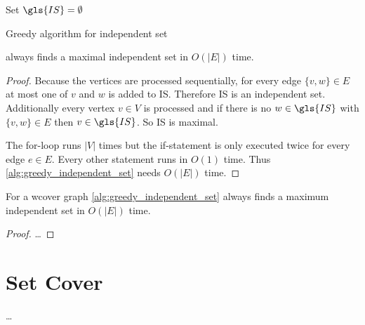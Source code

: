 

\begin{algorithm}
  \DontPrintSemicolon
  
  
  Set \(\gls{IS} = \emptyset\) \;
  \caption{\label{alg:greedy_independent_set}Greedy algorithm for independent set}
\end{algorithm}


\begin{theorem}
   always finds a maximal independent
  set in \(O(|E|)\) time.
\end{theorem}

\begin{proof}
  Because the vertices are processed sequentially, for every edge
  \(\{v,w\} \in E\) at most one of \(v\) and \(w\) is added to
  \gls{IS}. Therefore \gls{IS} is an independent set. Additionally 
  every vertex \(v \in V\) is processed and if there is no
  \(w \in \gls{IS}\) with \(\{v,w\} \in E\) then \(v \in \gls{IS}\).
  So \gls{IS} is maximal.
  
  The for-loop runs \(|V|\) times but the if-statement is only
  executed twice for every edge \(e \in E\). Every other statement
  runs in \(O(1)\) time. Thus \cref{alg:greedy_independent_set} needs
  \(O(|E|)\) time.
\end{proof}


\begin{theorem}
  \label{thm:well_covered_minimum_independent_set}
  For a \gls{wcover} graph \cref{alg:greedy_independent_set} always
  finds a maximum independent set in \(O(|E|)\) time.
\end{theorem}

\begin{proof}
  \ldots{}
\end{proof}

\section{Set Cover}
\ldots{}

